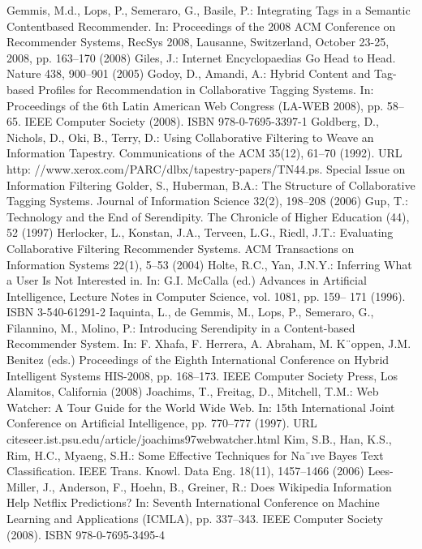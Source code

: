 \begin{thebibliography}{110}
Gemmis, M.d., Lops, P., Semeraro, G., Basile, P.: Integrating Tags in a Semantic Contentbased Recommender. In: Proceedings of the 2008 ACM Conference on Recommender Systems, RecSys 2008, Lausanne, Switzerland, October 23-25, 2008, pp. 163–170 (2008)
Giles, J.: Internet Encyclopaedias Go Head to Head. Nature 438, 900–901 (2005)
Godoy, D., Amandi, A.: Hybrid Content and Tag-based Profiles for Recommendation in Collaborative Tagging Systems. In: Proceedings of the 6th Latin American Web Congress (LA-WEB 2008), pp. 58–65. IEEE Computer Society (2008). ISBN 978-0-7695-3397-1
Goldberg, D., Nichols, D., Oki, B., Terry, D.: Using Collaborative Filtering to Weave an Information Tapestry. Communications of the ACM 35(12), 61–70 (1992). URL http: //www.xerox.com/PARC/dlbx/tapestry-papers/TN44.ps. Special Issue on Information Filtering
Golder, S., Huberman, B.A.: The Structure of Collaborative Tagging Systems. Journal of Information Science 32(2), 198–208 (2006)
Gup, T.: Technology and the End of Serendipity. The Chronicle of Higher Education (44), 52 (1997)
Herlocker, L., Konstan, J.A., Terveen, L.G., Riedl, J.T.: Evaluating Collaborative Filtering Recommender Systems. ACM Transactions on Information Systems 22(1), 5–53 (2004)
Holte, R.C., Yan, J.N.Y.: Inferring What a User Is Not Interested in. In: G.I. McCalla (ed.) Advances in Artificial Intelligence, Lecture Notes in Computer Science, vol. 1081, pp. 159– 171 (1996). ISBN 3-540-61291-2
Iaquinta, L., de Gemmis, M., Lops, P., Semeraro, G., Filannino, M., Molino, P.: Introducing Serendipity in a Content-based Recommender System. In: F. Xhafa, F. Herrera, A. Abraham, M. K¨oppen, J.M. Benitez (eds.) Proceedings of the Eighth International Conference on Hybrid Intelligent Systems HIS-2008, pp. 168–173. IEEE Computer Society Press, Los Alamitos, California (2008)
Joachims, T., Freitag, D., Mitchell, T.M.: Web Watcher: A Tour Guide for the World Wide Web. In: 15th International Joint Conference on Artificial Intelligence, pp. 770–777 (1997). URL citeseer.ist.psu.edu/article/joachims97webwatcher.html
Kim, S.B., Han, K.S., Rim, H.C., Myaeng, S.H.: Some Effective Techniques for Na¨ıve Bayes Text Classification. IEEE Trans. Knowl. Data Eng. 18(11), 1457–1466 (2006)
Lees-Miller, J., Anderson, F., Hoehn, B., Greiner, R.: Does Wikipedia Information Help Netflix Predictions? In: Seventh International Conference on Machine Learning and Applications (ICMLA), pp. 337–343. IEEE Computer Society (2008). ISBN 978-0-7695-3495-4

\end{thebibliography}
